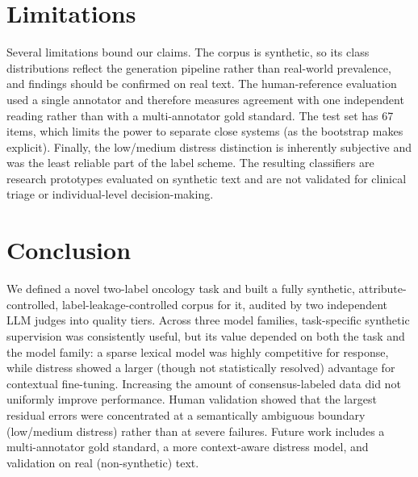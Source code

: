 \documentclass[11pt,a4paper]{article}
\begin{document}
\section{Limitations}
Several limitations bound our claims. The corpus is synthetic, so its class distributions reflect the
generation pipeline rather than real-world prevalence, and findings should be confirmed on real text.
The human-reference evaluation used a single annotator and therefore measures agreement with one
independent reading rather than with a multi-annotator gold standard. The test set has 67 items, which
limits the power to separate close systems (as the bootstrap makes explicit). Finally, the low/medium
distress distinction is inherently subjective and was the least reliable part of the label scheme. The
resulting classifiers are research prototypes evaluated on synthetic text and are not validated for
clinical triage or individual-level decision-making.

\section{Conclusion}
We defined a novel two-label oncology task and built a fully synthetic, attribute-controlled,
label-leakage-controlled corpus for it, audited by two independent LLM judges into quality tiers. Across
three model families, task-specific synthetic supervision was consistently useful, but its value
depended on both the task and the model family: a sparse lexical model was highly competitive for
response, while distress showed a larger (though not statistically resolved) advantage for contextual
fine-tuning. Increasing the amount of consensus-labeled data did not uniformly improve performance.
Human validation showed that the largest residual errors were concentrated at a semantically ambiguous
boundary (low/medium distress) rather than at severe failures. Future work includes a multi-annotator
gold standard, a more context-aware distress model, and validation on real (non-synthetic) text.
\end{document}
